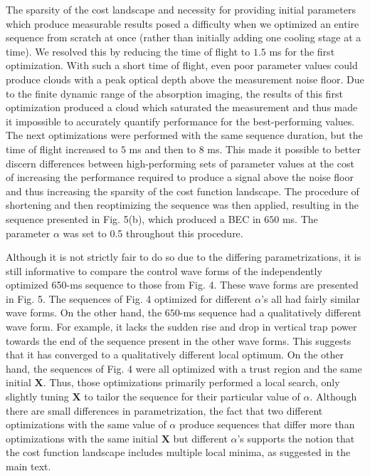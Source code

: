 \documentclass{article}
\begin{document}
The sparsity of the cost landscape and necessity for providing initial parameters which produce measurable results posed a difficulty when we optimized an entire sequence from scratch at once (rather than initially adding one cooling stage at a time). We resolved this by reducing the time of flight to $1.5$ ms for the first optimization. With such a short time of flight, even poor parameter values could produce clouds with a peak optical depth above the measurement noise floor. Due to the finite dynamic range of the absorption imaging, the results of this first optimization produced a cloud which saturated the measurement and thus made it impossible to accurately quantify performance for the best-performing values. The next optimizations were performed with the same sequence duration, but the time of flight increased to $5$ ms and then to $8$ ms. This made it possible to better discern differences between high-performing sets of parameter values at the cost of increasing the performance required to produce a signal above the noise floor and thus increasing the sparsity of the cost function landscape. The procedure of shortening and then reoptimizing the sequence was then applied, resulting in the sequence presented in Fig. 5(b), which produced a BEC in $650$ ms. The parameter $\alpha$ was set to 0.5 throughout this procedure.

Although it is not strictly fair to do so due to the differing parametrizations, it is still informative to compare the control wave forms of the independently optimized 650-ms sequence to those from Fig. 4. These wave forms are presented in Fig. 5. The sequences of Fig. 4 optimized for different $\alpha$’s all had fairly similar wave forms. On the other hand, the $650$-ms sequence had a qualitatively different wave form. For example, it lacks the sudden rise and drop in vertical trap power towards the end of the sequence present in the other wave forms. This suggests that it has converged to a qualitatively different local optimum. On the other hand, the sequences of Fig. 4 were all optimized with a trust region and the same initial $\mathbf{X}$. Thus, those optimizations primarily performed a local search, only slightly tuning $\mathbf{X}$ to tailor the sequence for their particular value of $\alpha$. Although there are small differences in parametrization, the fact that two different optimizations with the same value of $\alpha$ produce sequences that differ more than optimizations with the same initial $\mathbf{X}$ but different $\alpha$’s supports the notion that the cost function landscape includes multiple local minima, as suggested in the main text.
\end{document}
